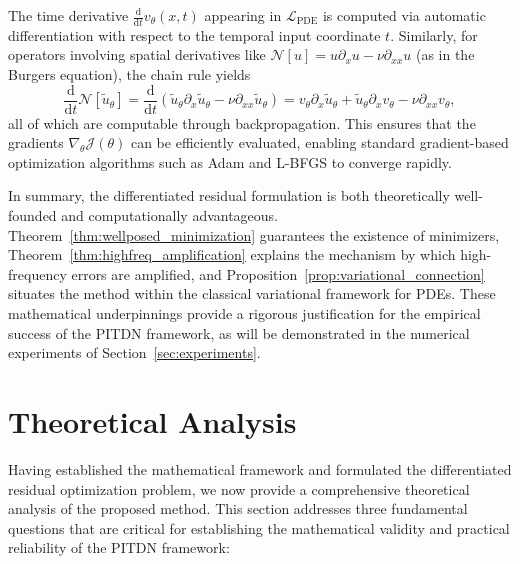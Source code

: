 \documentclass[11pt,reqno]{amsart}
\theoremstyle{plain}
\theoremstyle{definition}
\theoremstyle{remark}
\begin{document}
The time derivative $\frac{\mathrm{d}}{\mathrm{d}t}v_\theta(x,t)$ appearing in $\mathcal{L}_{\mathrm{PDE}}$ is computed via automatic differentiation with respect to the temporal input coordinate $t$. Similarly, for operators involving spatial derivatives like $\mathcal{N}[u] = u \partial_x u - \nu \partial_{xx} u$ (as in the Burgers equation), the chain rule yields
\[
\frac{\mathrm{d}}{\mathrm{d}t}\mathcal{N}[\tilde{u}_\theta] = \frac{\mathrm{d}}{\mathrm{d}t}\left( \tilde{u}_\theta \partial_x \tilde{u}_\theta - \nu \partial_{xx}\tilde{u}_\theta \right) = v_\theta \partial_x \tilde{u}_\theta + \tilde{u}_\theta \partial_x v_\theta - \nu \partial_{xx} v_\theta,
\]
all of which are computable through backpropagation. This ensures that the gradients $\nabla_\theta \mathcal{J}(\theta)$ can be efficiently evaluated, enabling standard gradient-based optimization algorithms such as Adam and L-BFGS to converge rapidly.

In summary, the differentiated residual formulation is both theoretically well-founded and computationally advantageous. Theorem~\ref{thm:wellposed_minimization} guarantees the existence of minimizers, Theorem~\ref{thm:highfreq_amplification} explains the mechanism by which high-frequency errors are amplified, and Proposition~\ref{prop:variational_connection} situates the method within the classical variational framework for PDEs. These mathematical underpinnings provide a rigorous justification for the empirical success of the PITDN framework, as will be demonstrated in the numerical experiments of Section~\ref{sec:experiments}.


\section{Theoretical Analysis}

Having established the mathematical framework and formulated the differentiated residual optimization problem, we now provide a comprehensive theoretical analysis of the proposed method. This section addresses three fundamental questions that are critical for establishing the mathematical validity and practical reliability of the PITDN framework:
\end{document}
